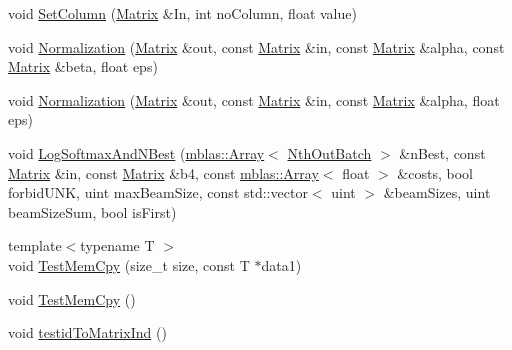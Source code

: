 \begin{DoxyCompactItemize}
\item 
void \hyperlink{namespaceamunmt_1_1GPU_1_1mblas_acc42d3fa7b4113baf1824863975336eb}{Set\+Column} (\hyperlink{namespaceamunmt_1_1GPU_1_1mblas_ab67821a8254de53e45a623cf73c0aef6}{Matrix} \&In, int no\+Column, float value)
\item 
void \hyperlink{namespaceamunmt_1_1GPU_1_1mblas_ae50f34596c0fcc0aa93e717edcd66379}{Normalization} (\hyperlink{namespaceamunmt_1_1GPU_1_1mblas_ab67821a8254de53e45a623cf73c0aef6}{Matrix} \&out, const \hyperlink{namespaceamunmt_1_1GPU_1_1mblas_ab67821a8254de53e45a623cf73c0aef6}{Matrix} \&in, const \hyperlink{namespaceamunmt_1_1GPU_1_1mblas_ab67821a8254de53e45a623cf73c0aef6}{Matrix} \&alpha, const \hyperlink{namespaceamunmt_1_1GPU_1_1mblas_ab67821a8254de53e45a623cf73c0aef6}{Matrix} \&beta, float eps)
\item 
void \hyperlink{namespaceamunmt_1_1GPU_1_1mblas_ae1115239ef99415332b16c92bb64ca2d}{Normalization} (\hyperlink{namespaceamunmt_1_1GPU_1_1mblas_ab67821a8254de53e45a623cf73c0aef6}{Matrix} \&out, const \hyperlink{namespaceamunmt_1_1GPU_1_1mblas_ab67821a8254de53e45a623cf73c0aef6}{Matrix} \&in, const \hyperlink{namespaceamunmt_1_1GPU_1_1mblas_ab67821a8254de53e45a623cf73c0aef6}{Matrix} \&alpha, float eps)
\item 
void \hyperlink{namespaceamunmt_1_1GPU_1_1mblas_ac32bfddb0814404f44facd8cf8b9a810}{Log\+Softmax\+And\+N\+Best} (\hyperlink{classamunmt_1_1GPU_1_1mblas_1_1Array}{mblas\+::\+Array}$<$ \hyperlink{structamunmt_1_1GPU_1_1NthOutBatch}{Nth\+Out\+Batch} $>$ \&n\+Best, const \hyperlink{namespaceamunmt_1_1GPU_1_1mblas_ab67821a8254de53e45a623cf73c0aef6}{Matrix} \&in, const \hyperlink{namespaceamunmt_1_1GPU_1_1mblas_ab67821a8254de53e45a623cf73c0aef6}{Matrix} \&b4, const \hyperlink{classamunmt_1_1GPU_1_1mblas_1_1Array}{mblas\+::\+Array}$<$ float $>$ \&costs, bool forbid\+U\+NK, uint max\+Beam\+Size, const std\+::vector$<$ uint $>$ \&beam\+Sizes, uint beam\+Size\+Sum, bool is\+First)
\item 
{\footnotesize template$<$typename T $>$ }\\void \hyperlink{namespaceamunmt_1_1GPU_1_1mblas_ab76a2b350282de9a3eaea50aab7dc329}{Test\+Mem\+Cpy} (size\+\_\+t size, const T $\ast$data1)
\item 
void \hyperlink{namespaceamunmt_1_1GPU_1_1mblas_aaef53311a23d2ea53d71d0ae0cfe73d0}{Test\+Mem\+Cpy} ()
\item 
void \hyperlink{namespaceamunmt_1_1GPU_1_1mblas_a0c789c549a804f74120e5e6fd546a58f}{testid\+To\+Matrix\+Ind} ()
\end{DoxyCompactItemize}



